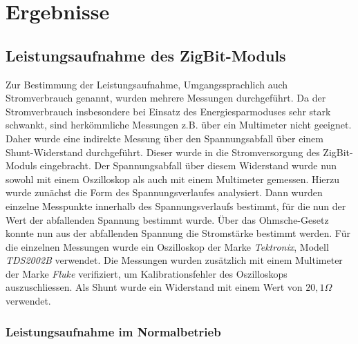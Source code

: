 


\chapter{Ergebnisse}
\section{Leistungsaufnahme des ZigBit-Moduls}
Zur Bestimmung der Leistungsaufnahme, Umgangssprachlich auch Stromverbrauch genannt, wurden mehrere Messungen durchgeführt.
Da der Stromverbrauch insbesondere bei Einsatz des Energiesparmoduses sehr stark schwankt, sind herkömmliche Messungen
z.B. über ein Multimeter nicht geeignet. Daher wurde eine indirekte Messung über den Spannungsabfall über einem 
Shunt-Widerstand durchgeführt. Dieser wurde in die Stromversorgung des ZigBit-Moduls eingebracht. Der Spannungsabfall
über diesem Widerstand wurde nun sowohl mit einem Oszilloskop als auch mit einem Multimeter gemessen. Hierzu wurde zunächst
die Form des Spannungsverlaufes analysiert. Dann wurden einzelne Messpunkte innerhalb des Spannungsverlaufs bestimmt,
für die nun der Wert der abfallenden Spannung bestimmt wurde. Über das Ohmsche-Gesetz konnte nun aus der abfallenden
Spannung die Stromstärke bestimmt werden. Für die einzelnen Messungen wurde ein Oszilloskop der Marke \emph{Tektronix}, 
Modell \emph{TDS2002B} verwendet. Die Messungen wurden zusätzlich mit einem Multimeter der Marke \emph{Fluke} verifiziert,
um Kalibrationsfehler des Oszilloskops auszuschliessen. Als Shunt wurde ein Widerstand mit einem Wert von $20,1\Omega$
verwendet.

\subsection{Leistungsaufnahme im Normalbetrieb}

